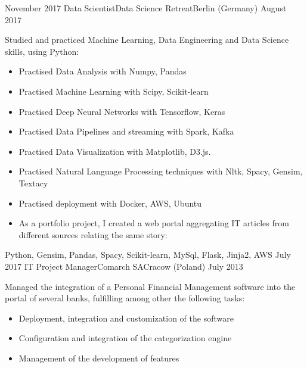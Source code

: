 %
%
%
\begin{experiences}
  \experience
    {November 2017}   {Data Scientist}{Data Science Retreat}{Berlin (Germany)}
    {August 2017}  {Studied and practiced Machine Learning, Data Engineering and Data Science skills, using Python: 
                      \begin{itemize}
                      \item Practised Data Analysis with Numpy, Pandas
                      \item Practised Machine Learning with Scipy, Scikit-learn
					   \item Practised Deep Neural Networks with Tensorflow, Keras
					   \item Practised Data Pipelines and streaming with Spark, Kafka
					   \item Practised Data Visualization with Matplotlib, D3.js. 
					   \item Practised Natural Language Processing techniques with Nltk, Spacy, Gensim, Textacy
					   \item Practised deployment with Docker, AWS, Ubuntu
					   \item As a portfolio project, I created a web portal aggregating IT articles from different sources relating the same story: 
                      \end{itemize}
                    }
                    {Python, Gensim, Pandas, Spacy, Scikit-learn, MySql, Flask, Jinja2, AWS}
  \emptySeparator
  \experience
    {July 2017} {IT Project Manager}{Comarch SA}{Cracow (Poland)}
    {July 2013} {Managed the integration of a Personal Financial Management software into the portal of several banks, fulfilling among other the following tasks:
       			 \begin{itemize}
                        \item Deployment, integration and customization of the software
                        \item Configuration and integration of the categorization engine                        
                        \item Management of the development of features 

\end{itemize}}
\end{experiences}
